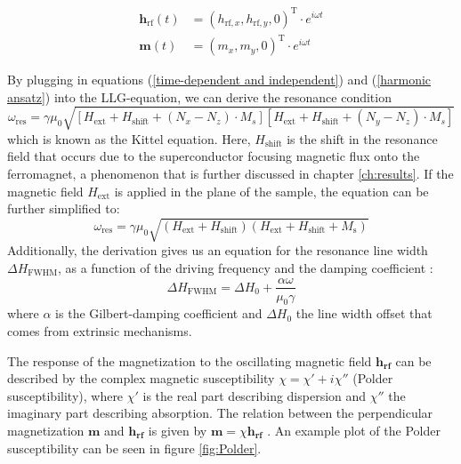 \begin{equation}
\begin{aligned}
\mathbf{h}_{\text{rf}}(t) &= (h_{\text{rf},x}, h_{\text{rf},y}, 0)^{\text{T}} \cdot e^{i\omega t} \\
\mathbf{m}(t) &= (m_{x}, m_{y}, 0)^{\text{T}} \cdot e^{i\omega t}
\label{harmonic ansatz}
\end{aligned}
\end{equation}

By plugging in equations (\ref{time-dependent and independent}) and (\ref{harmonic ansatz}) into the LLG-equation, we can derive the resonance condition
\begin{equation}
\omega_\text{res} = \gamma\mu_0 \sqrt{\left[H_{\text{ext}} + H_\textrm{shift} + (N_x - N_z) \cdot M_s\right]\left[H_{\text{ext}} + H_\textrm{shift} + (N_y - N_z) \cdot M_s\right]}
\label{Kittel equation}
\end{equation}
which is known as the Kittel equation. Here, $H_\textrm{shift}$ is the shift in the resonance field that occurs due to the superconductor focusing magnetic flux onto the ferromagnet, a phenomenon that is further discussed in chapter \ref{ch:results}. If the magnetic field $H_{\text{ext}}$ is applied in the plane of the sample, the equation can be further simplified to:
\begin{equation}
\omega_\text{res} = \gamma \mu_0 \sqrt{(H_{\text{ext}} + H_\textrm{shift})(H_{\text{ext}} + H_\textrm{shift} +M_\text{s})}
\end{equation}
Additionally, the derivation gives us an equation for the resonance line width $\Delta H_{\textrm{FWHM}}$, as a function of the driving frequency and the damping coefficient \cite{Mueller2023}:
\begin{equation}
    \Delta H_{\textrm{FWHM}} = \Delta H_0 + \frac{\alpha \omega}{\mu_0 \gamma}
    \label{linewidth equation}
\end{equation}
where $\alpha$ is the Gilbert-damping coefficient and $\Delta H_0$ the line width offset that comes from extrinsic mechanisms.

The response of the magnetization to the oscillating magnetic field $\mathbf{h_{\text{rf}}}$ can be described by the complex magnetic susceptibility $\chi = \chi' + i\chi''$ (Polder susceptibility), where $\chi'$ is the real part describing dispersion and $\chi''$ the imaginary part describing absorption. The relation between the perpendicular magnetization $\mathbf{m}$ and $\mathbf{h_{\text{rf}}}$ is given by $ \mathbf{m} = \chi \mathbf{h_{\text{rf}}}$ \cite{Liensberger2017}. An example plot of the Polder susceptibility can be seen in figure \ref{fig:Polder}.

